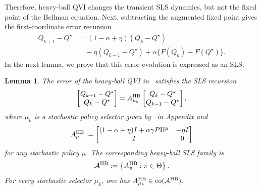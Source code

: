 \documentclass[letterpaper]{article}
\numberwithin{equation}{section}
\newtheorem{lemma}{Lemma}[section]
\newcommand{\co}{\operatorname{co}}
\begin{document}
Therefore, heavy-ball QVI changes the transient SLS dynamics, but not the fixed
point of the Bellman equation. Next, subtracting the augmented fixed point gives the
first-coordinate error recursion
\begin{equation}
\begin{aligned}
Q_{k+1}-Q^\star
  &=(1-\alpha+\eta)(Q_k-Q^\star)\\
  &\quad-\eta(Q_{k-1}-Q^\star)
    +\alpha\{F(Q_k)-F(Q^\star)\}.
\end{aligned}
\label{eq:error-dynamic1}
\end{equation}
In the next lemma, we prove that this error evolution is expressed as an SLS.
\begin{lemma}
\label{lem:hb-exact-sls}
The error of the heavy-ball QVI in~ satisfies the SLS recursion
\begin{equation}
  \begin{bmatrix}Q_{k+1}-Q^\star\\Q_k-Q^\star\end{bmatrix}
  =A_{\mu_k}^{\rm HB}
  \begin{bmatrix}Q_k-Q^\star\\Q_{k-1}-Q^\star\end{bmatrix},
  \label{eq:simple-error}
\end{equation}
where $\mu_k$ is a stochastic policy selector given by~ in Appendix and
\begin{align*}
  A_\mu^{\rm HB}:=
  \begin{bmatrix}
    (1-\alpha+\eta)I+\alpha\gamma P\Pi^\mu & -\eta I\\
    I&0
  \end{bmatrix}
\end{align*}
for any stochastic policy $\mu$. The corresponding heavy-ball SLS family is
\begin{equation}
  \mathcal A^{\rm HB}:=\left\{A_\pi^{\rm HB}:\pi\in\Theta\right\}.
  \label{eq:hb-mode-set}
\end{equation}
For every stochastic selector $\mu_k$, one has
$A_{\mu_k}^{\rm HB}\in\co(\mathcal A^{\rm HB})$.
\end{lemma}
\end{document}
